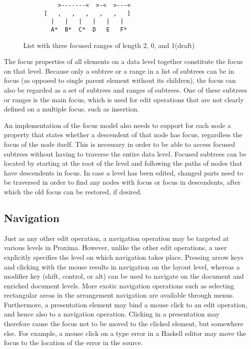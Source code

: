 \begin{figure}
\begin{small}
\begin{center}
\begin{verbatim}
          >-------<  >-<  >---<          
      [   ,   ,   ,   ,   ,   ]
        |   |   |   |   |   |
        A*  B*  C*  D   E   F*

\end{verbatim}
\caption{List with three focused ranges of length 2, 0, and 1(draft)}\label{listFocus} 
\end{center}
\end{small}
\end{figure}


The focus properties of all elements on a data level together constitute the focus on that level. Because only a subtree or a range in a list of subtrees can be in focus (as opposed to single parent element without its children), the focus can also be regarded as a set of subtrees and ranges of subtrees. One of these subtrees or ranges is the main focus, which is used for edit operations that are not clearly defined on a multiple focus, such as insertion.

An implementation of the focus model also needs to support for each node a property that states whether a descendent of that node has focus, regardless the focus of the node itself. This is necessary in order to be able to access focused subtrees without having to traverse the entire data level. Focused subtrees can be located by starting at the root of the level and following the paths of nodes that have descendents in focus.  In case a level has been edited, changed parts need to be traversed in order to find any nodes with focus or focus in descendents, after which the old focus can be restored, if desired.


%																
\subsection{Navigation}

Just as any other edit operation, a navigation operation may be targeted at various levels in Proxima. However, unlike the other edit operations, a user explicitly specifies the level on which navigation takes place. Pressing arrow keys and clicking with the mouse results in navigation on the layout level, whereas a modifier key (shift, control, or alt) can be used to navigate on the document and enriched document levels. \bc More exotic navigation operations such as selecting rectangular areas in the arrangement navigation are available through menus. \ec Furthermore, a presentation element may bind a mouse click to an edit operation, and hence also to a navigation operation. Clicking in a presentation may therefore cause the focus not to be moved to the clicked element, but somewhere else. For example, a mouse click on a type error in a Haskell editor may move the focus to the location of the error in the source.


